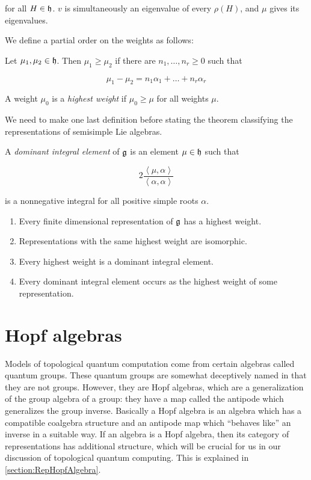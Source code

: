 for all $H \in \mathfrak{h}$. $v$ is simultaneously an eigenvalue of every $\rho(H)$,
and $\mu$ gives its eigenvalues.

We define a partial order on the weights as follows:

\begin{defn}
Let $\mu_1, \mu_2 \in \mathfrak{h}$. Then $\mu_1 \geq \mu_2$ if there are $n_1, \ldots, n_r \geq 0$ such that 

\begin{equation}
\mu_1 - \mu_2 = n_1 \alpha_1 + \ldots + n_r \alpha_r
\end{equation}

A weight $\mu_0$ is a \emph{highest weight} if $\mu_0 \geq \mu$ for all weights $\mu$.

\end{defn}

We need to make one last definition before stating the theorem classifying the representations of semisimple Lie algebras.

\begin{defn}
A \emph{dominant integral element} of $\mathfrak{g}$ is an element $\mu \in \mathfrak{h}$ such that

\begin{equation}
2 \frac{\left<\mu,\alpha\right>}{\left<\alpha,\alpha\right>}
\end{equation}

is a nonnegative integral for all positive simple roots $\alpha$.
\end{defn}
\begin{theorem}
\begin{enumerate}
\item Every finite dimensional representation of $\mathfrak{g}$ has a highest weight.
\item Representations with the same highest weight are isomorphic.
\item Every highest weight is a dominant integral element.
\item Every dominant integral element occurs as the highest weight of some representation.
\end{enumerate}
\end{theorem}



\section{Hopf algebras}

Models of topological quantum computation come from certain algebras called
quantum groups. These quantum groups are somewhat deceptively named in that
they are not groups. However, they are Hopf algebras, which  are a
generalization of the group algebra of a group: they have a map called the
antipode which generalizes the group inverse. Basically a Hopf algebra is an
algebra which has a compatible coalgebra structure and an antipode map which
``behaves like'' an inverse in a suitable way. If an algebra is a Hopf algebra,
then its category of representations has additional structure, which will
be crucial for us in our discussion of topological quantum computing. This is
explained in \ref{section:RepHopfAlgebra}. 

